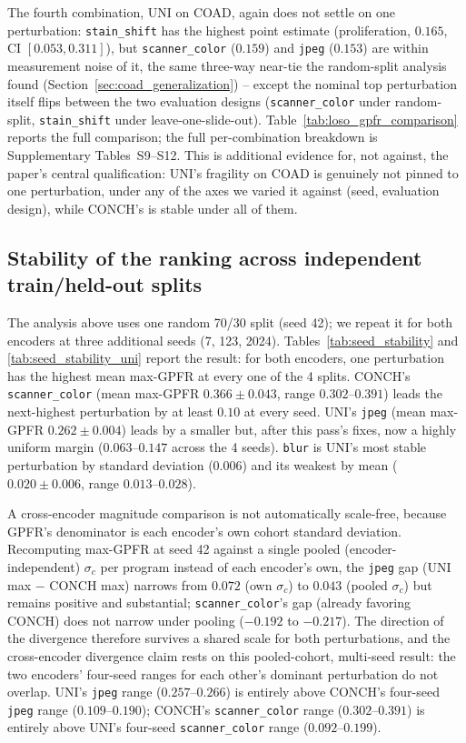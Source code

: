 \documentclass[11pt]{article}
\begin{document}
The fourth combination, UNI on COAD, again does not settle on one perturbation: \texttt{stain\_shift} has the highest point estimate (proliferation, $0.165$, CI $[0.053, 0.311]$), but \texttt{scanner\_color} ($0.159$) and \texttt{jpeg} ($0.153$) are within measurement noise of it, the same three-way near-tie the random-split analysis found (Section~\ref{sec:coad_generalization}) -- except the nominal top perturbation itself flips between the two evaluation designs (\texttt{scanner\_color} under random-split, \texttt{stain\_shift} under leave-one-slide-out). Table~\ref{tab:loso_gpfr_comparison} reports the full comparison; the full per-combination breakdown is Supplementary Tables~S9--S12. This is additional evidence for, not against, the paper's central qualification: UNI's fragility on COAD is genuinely not pinned to one perturbation, under any of the axes we varied it against (seed, evaluation design), while CONCH's is stable under all of them.



\subsection{Stability of the ranking across independent train/held-out splits}
\label{sec:seed_stability}
The analysis above uses one random 70/30 split (seed 42); we repeat it for both encoders at three additional seeds (7, 123, 2024). Tables~\ref{tab:seed_stability} and \ref{tab:seed_stability_uni} report the result: for both encoders, one perturbation has the highest mean max-GPFR at every one of the 4 splits. CONCH's \texttt{scanner\_color} (mean max-GPFR $0.366\pm0.043$, range $0.302$--$0.391$) leads the next-highest perturbation by at least $0.10$ at every seed. UNI's \texttt{jpeg} (mean max-GPFR $0.262\pm0.004$) leads by a smaller but, after this pass's fixes, now a highly uniform margin ($0.063$--$0.147$ across the 4 seeds). \texttt{blur} is UNI's most stable perturbation by standard deviation ($0.006$) and its weakest by mean ($0.020\pm0.006$, range $0.013$--$0.028$).

A cross-encoder magnitude comparison is not automatically scale-free, because GPFR's denominator is each encoder's own cohort standard deviation. Recomputing max-GPFR at seed 42 against a single pooled (encoder-independent) $\sigma_c$ per program instead of each encoder's own, the \texttt{jpeg} gap (UNI max $-$ CONCH max) narrows from $0.072$ (own $\sigma_c$) to $0.043$ (pooled $\sigma_c$) but remains positive and substantial; \texttt{scanner\_color}'s gap (already favoring CONCH) does not narrow under pooling ($-0.192$ to $-0.217$). The direction of the divergence therefore survives a shared scale for both perturbations, and the cross-encoder divergence claim rests on this pooled-cohort, multi-seed result: the two encoders' four-seed ranges for each other's dominant perturbation do not overlap. UNI's \texttt{jpeg} range ($0.257$--$0.266$) is entirely above CONCH's four-seed \texttt{jpeg} range ($0.109$--$0.190$); CONCH's \texttt{scanner\_color} range ($0.302$--$0.391$) is entirely above UNI's four-seed \texttt{scanner\_color} range ($0.092$--$0.199$).
\end{document}
